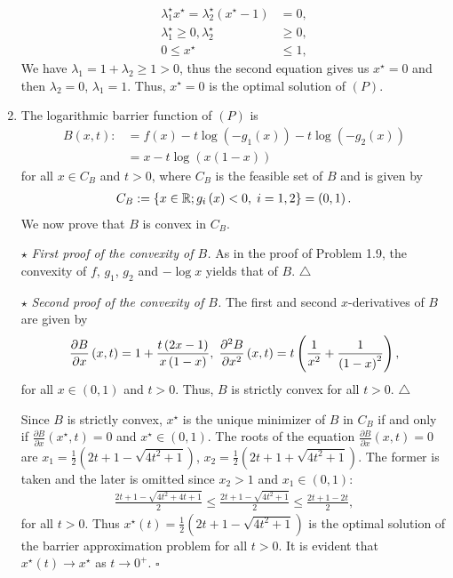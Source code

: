 \documentclass[a4paper]{article}
\numberwithin{equation}{section}
\begin{document}
\begin{enumerate}
\begin{align}
\lambda _1^\star{x^\star} = \lambda _2^\star\left( {{x^\star} - 1} \right) &= 0,\\
\lambda _1^\star \ge 0,\lambda _2^\star &\ge 0,\\
0 \le {x^\star} &\le 1,
\end{align}
We have $\lambda_1=1+\lambda _2\ge 1>0$, thus the second equation gives us $x^\star =0$ and then $\lambda _2=0$, $\lambda _1=1$. Thus, $x^\star =0$ is the optimal solution of $\left(P\right)$.
\item The logarithmic barrier function of $\left(P\right)$ is 
\begin{align}
B\left( {x,t} \right): &= f\left( x \right) - t\log \left( { - {g_1}\left( x \right)} \right) - t\log \left( { - {g_2}\left( x \right)} \right)\\
& = x - t\log \left( {x\left( {1 - x} \right)} \right)
\end{align}
for all $x\in C_B$ and $t>0$, where $C_B$ is the feasible set of $B$ and is given by
\begin{align}
{C_B}: = \left\{ {x \in \mathbb{R};{g_i}\left( x \right) < 0,\hspace{0.1cm} i = 1,2} \right\} = \left( {0,1} \right).
\end{align}
We now prove that $B$ is convex in $C_B$.

$\star$ \textit{First proof of the convexity of $B$.} As in the proof of Problem 1.9, the convexity of $f$, $g_1$, $g_2$ and $-\log x$ yields that of $B$. \hfill $\triangle$

$\star$ \textit{Second proof of the convexity of $B$.} The first and second $x$-derivatives of $B$ are given by 
\begin{align}
\frac{{\partial B}}{{\partial x}}\left( {x,t} \right) = 1 + \frac{{t\left( {2x - 1} \right)}}{{x\left( {1 - x} \right)}},\hspace{0.1cm} \frac{{{\partial ^2}B}}{{\partial {x^2}}}\left( {x,t} \right) = t\left( {\frac{1}{{{x^2}}} + \frac{1}{{{{\left( {1 - x} \right)}^2}}}} \right),
\end{align}
for all $x\in \left(0,1\right)$ and $t>0$. Thus, $B$ is strictly convex for all $t>0$. \hfill $\triangle$

Since $B$ is strictly convex, $x^\star$ is the unique minimizer of $B$ in $C_B$ if and only if $\frac{{\partial B}}{{\partial x}}\left( {{x^\star},t} \right) = 0$ and $x^\star \in \left(0,1\right)$. The roots of the equation $\frac{{\partial B}}{{\partial x}}\left( {x,t} \right) = 0$ are ${x_1} = \frac{1}{2}\left( {2t + 1 - \sqrt {4{t^2} + 1} } \right)$, ${x_2} = \frac{1}{2}\left( {2t + 1 + \sqrt {4{t^2} + 1} } \right)$. The former is taken and the later is omitted since $x_2>1$ and $x_1\in \left(0,1\right)$:
\begin{align}
\frac{{2t + 1 - \sqrt {4{t^2} + 4t + 1} }}{2} \le \frac{{2t + 1 - \sqrt {4{t^2} + 1} }}{2} \le \frac{{2t + 1 - 2t}}{2},
\end{align}
for all $t>0$. Thus $x^\star \left(t\right) =\frac{1}{2}\left( {2t + 1 - \sqrt {4{t^2} + 1} } \right)$ is the optimal solution of the barrier approximation problem for all $t>0$. It is evident that $x^\star \left(t\right)\to x^\star$ as $t\to 0^+$. \hfill $\square$
\end{enumerate}
\end{document}
